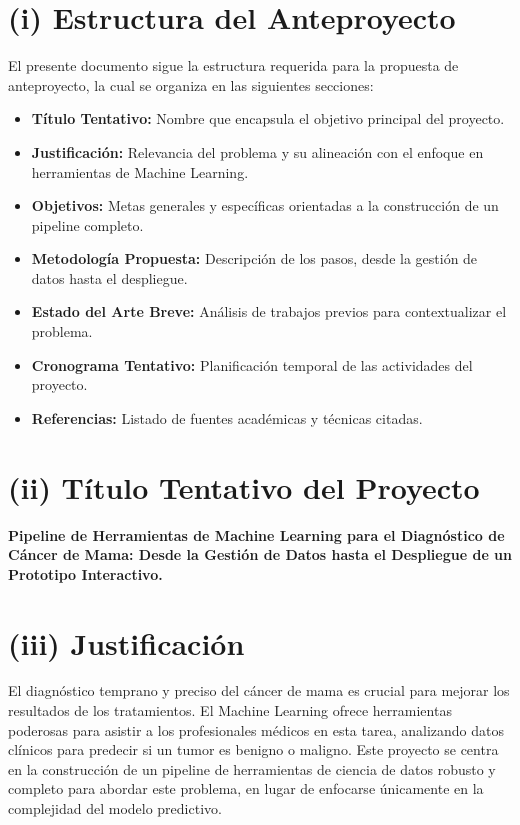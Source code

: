 \documentclass[12pt]{src/formato_utem}
\begin{document}
\pagestyle{fancy}
\makemytitle

\newpage



\section*{(i) Estructura del Anteproyecto}
El presente documento sigue la estructura requerida para la propuesta de anteproyecto, la cual se organiza en las siguientes secciones:
\begin{itemize}
    \item \textbf{Título Tentativo:} Nombre que encapsula el objetivo principal del proyecto.
    \item \textbf{Justificación:} Relevancia del problema y su alineación con el enfoque en herramientas de Machine Learning.
    \item \textbf{Objetivos:} Metas generales y específicas orientadas a la construcción de un pipeline completo.
    \item \textbf{Metodología Propuesta:} Descripción de los pasos, desde la gestión de datos hasta el despliegue.
    \item \textbf{Estado del Arte Breve:} Análisis de trabajos previos para contextualizar el problema.
    \item \textbf{Cronograma Tentativo:} Planificación temporal de las actividades del proyecto.
    \item \textbf{Referencias:} Listado de fuentes académicas y técnicas citadas.
\end{itemize}
\section*{(ii) Título Tentativo del Proyecto}
\textbf{Pipeline de Herramientas de Machine Learning para el Diagnóstico de Cáncer de Mama: Desde la Gestión de Datos hasta el Despliegue de un Prototipo Interactivo.}
\section*{(iii) Justificación}
El diagnóstico temprano y preciso del cáncer de mama es crucial para mejorar los resultados de los tratamientos. El Machine Learning ofrece herramientas poderosas para asistir a los profesionales médicos en esta tarea, analizando datos clínicos para predecir si un tumor es benigno o maligno. Este proyecto se centra en la construcción de un pipeline de herramientas de ciencia de datos robusto y completo para abordar este problema, en lugar de enfocarse únicamente en la complejidad del modelo predictivo.
\end{document}
